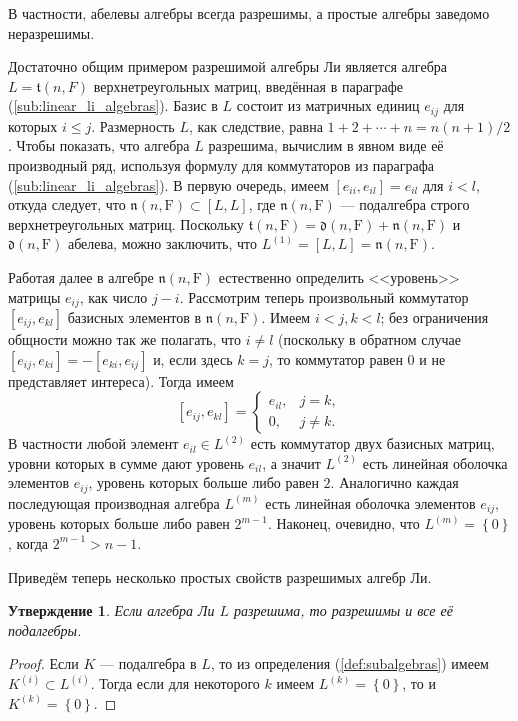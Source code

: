\documentclass[a4paper, 12pt]{article}
\newtheorem{proposition}[theorem]{Утверждение}
\theoremstyle{definition}
\begin{document}
В частности, абелевы алгебры всегда разрешимы, а простые алгебры заведомо неразрешимы.

Достаточно общим примером разрешимой алгебры Ли является алгебра \({ L = \mathfrak{t} (n, F) }\) верхнетреугольных матриц, введённая в параграфе (\ref{sub:linear_li_algebras}). Базис в \({ L }\) состоит из матричных единиц \({ e_{ij} }\) для которых \({ i \leqslant j }\). Размерность \({ L }\), как следствие, равна \({ 1 + 2 + \cdots + n = n(n + 1)/2 }\). Чтобы показать, что алгебра \({ L }\) разрешима, вычислим в явном виде её производный ряд, используя формулу для коммутаторов из параграфа (\ref{sub:linear_li_algebras}). В первую очередь, имеем \({ [e_{ii}, e_{il}] = e_{il} }\) для \({ i < l }\), откуда следует, что \({ \mathfrak{n}(n, \mathrm F) \subset [L, L] }\), где \({ \mathfrak{n}(n, \mathrm F) }\) --- подалгебра строго верхнетреугольных матриц. Поскольку \({ \mathfrak{t}(n ,\mathrm F) = \mathfrak{d}(n, \mathrm F) + \mathfrak{n}(n, \mathrm F) }\) и \({ \mathfrak{d}(n, \mathrm F) }\) абелева, можно заключить, что \({ L^{(1)} = [L, L] = \mathfrak{n}(n, \mathrm F) }\).

Работая далее в алгебре \({ \mathfrak{n}(n, \mathrm F) }\) естественно определить <<уровень>> матрицы \({ e_{ij} }\), как число \({ j - i }\). Рассмотрим теперь произвольный коммутатор \({ [e_{ij}, e_{kl}] }\) базисных элементов в \({ \mathfrak{n}(n, \mathrm F) }\). Имеем \({ i < j, k < l }\); без ограничения общности можно так же полагать, что \({ i \neq l }\) (поскольку в обратном случае \({ [e_{ij}, e_{ki}] = -[e_{ki}, e_{ij}] }\) и, если здесь \({ k = j }\), то коммутатор равен \({ 0 }\) и не представляет интереса). Тогда имеем
\[
    [e_{ij}, e_{kl}] = \begin{cases}
        e_{il}, & j = k, \\
        0, & j \neq k.
    \end{cases}
\]
В частности любой элемент \({ e_{il} \in L^{(2)} }\) есть коммутатор двух базисных матриц, уровни которых в сумме дают уровень \({ e_{il} }\), а значит \({ L^{(2)} }\) есть линейная оболочка элементов \({ e_{ij} }\), уровень которых больше либо равен \({ 2 }\). Аналогично каждая последующая производная алгебра \({ L^{(m)} }\) есть линейная оболочка элементов \({ e_{ij} }\), уровень которых больше либо равен \({ 2^{m - 1} }\). Наконец, очевидно, что \({ L^{(m)} = \left\{ 0 \right\} }\), когда \({ 2^{m - 1} > n - 1 }\).

Приведём теперь несколько простых свойств разрешимых алгебр Ли.

\begin{proposition}
    Если алгебра Ли \({ L }\) разрешима, то разрешимы и все её подалгебры.
\end{proposition}
\begin{proof}
    Если \({ K }\) --- подалгебра в \({ L }\), то из определения (\ref{def:subalgebras}) имеем \({ K^{(i)} \subset L^{(i)} }\). Тогда если для некоторого \({ k }\) имеем \({ L^{(k)} = \left\{ 0 \right\} }\), то и \({ K^{(k)} = \left\{ 0 \right\} }\).
\end{proof}
\end{document}

